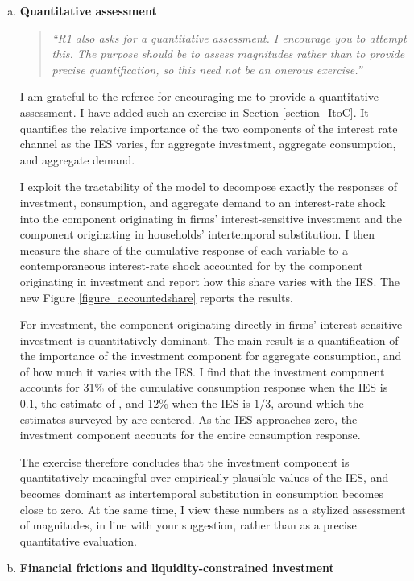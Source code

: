 \documentclass[11pt]{article}
\begin{document}
\begin{enumerate}[a)]
\item  \textbf{Quantitative assessment}

\begin{quote}
\itshape ``R1 also asks for a quantitative assessment. I encourage you to attempt this. The purpose should be to assess magnitudes rather than to provide precise quantification, so this need not be an onerous exercise.''
\end{quote}

I am grateful to the referee for encouraging me to provide a quantitative assessment. I have added such an exercise in Section \ref{section_ItoC}. It quantifies the relative importance of the two components of the interest rate channel as the IES varies, for aggregate investment, aggregate consumption, and aggregate demand.

I exploit the tractability of the model to decompose exactly the responses of investment, consumption, and aggregate demand to an interest-rate shock into the component originating in firms' interest-sensitive investment and the component originating in households' intertemporal substitution. I then measure the share of the cumulative response of each variable to a contemporaneous interest-rate shock accounted for by the component originating in investment and report how this share varies with the IES. The new Figure \ref{figure_accountedshare} reports the results.

For investment, the component originating directly in firms' interest-sensitive investment is quantitatively dominant. The main result is a quantification of the importance of the investment component for aggregate consumption, and of how much it varies with the IES. I find that the investment component accounts for 31\% of the cumulative consumption response when the IES is 0.1, the estimate of \cite{Bestetal2020}, and 12\% when the IES is $1/3$, around which the estimates surveyed by \cite{Havranek2015} are centered. As the IES approaches zero, the investment component accounts for the entire consumption response.

The exercise therefore concludes that the investment component is quantitatively meaningful over empirically plausible values of the IES, and becomes dominant as intertemporal substitution in consumption becomes close to zero. At the same time, I view these numbers as a stylized assessment of magnitudes, in line with your suggestion, rather than as a precise quantitative evaluation.

\item  \textbf{Financial frictions and liquidity-constrained investment}


\end{enumerate}
\end{document}
